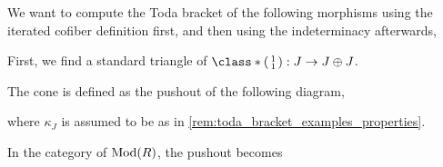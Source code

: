 \begin{example}
	We want to compute the Toda bracket of the following morphisms using the iterated cofiber definition first, and then using the indeterminacy afterwards,
	\begin{center}
	\end{center}

	First, we find a standard triangle of \( \class*{\begin{psmallmatrix} 1 \\ 1 \end{psmallmatrix}}: J \to J \oplus J \).

	The cone is defined as the pushout of the following diagram,
	\begin{center}
	\end{center}
	where \( \kappa_J \) is assumed to be as in \autoref{rem:toda_bracket_examples_properties}.

	In the category of \( \operatorname{Mod}(R) \), the pushout becomes
	\begin{center}
\end{center}
\end{example}
